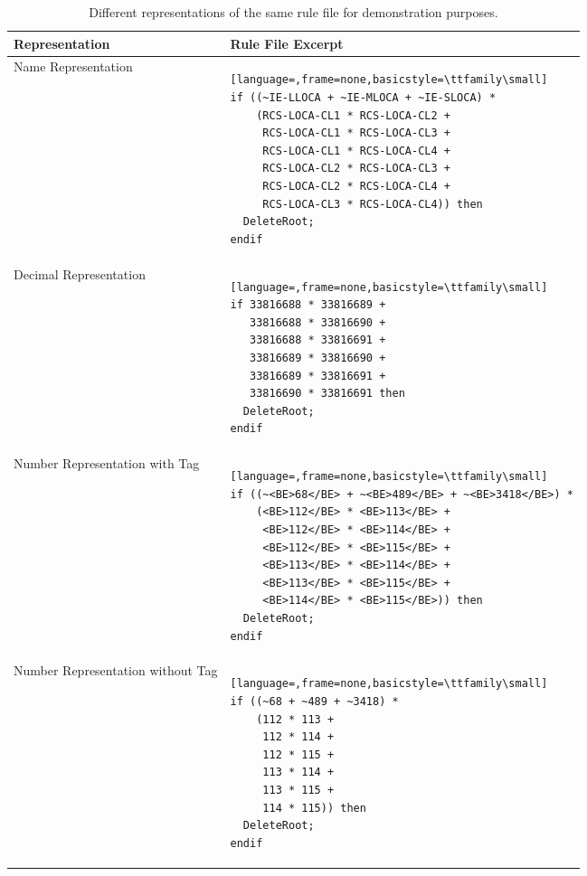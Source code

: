\begin{table}[H]
\centering
\caption{Different representations of the same rule file for demonstration purposes.}
\label{tab:rule-file-representations}
\begin{tabular}{@{}ll@{}}
\toprule
\textbf{Representation} & \textbf{Rule File Excerpt} \\
\midrule
Name Representation &
\begin{lstlisting}[language=,frame=none,basicstyle=\ttfamily\small]
if ((~IE-LLOCA + ~IE-MLOCA + ~IE-SLOCA) *
    (RCS-LOCA-CL1 * RCS-LOCA-CL2 +
     RCS-LOCA-CL1 * RCS-LOCA-CL3 +
     RCS-LOCA-CL1 * RCS-LOCA-CL4 +
     RCS-LOCA-CL2 * RCS-LOCA-CL3 +
     RCS-LOCA-CL2 * RCS-LOCA-CL4 +
     RCS-LOCA-CL3 * RCS-LOCA-CL4)) then
  DeleteRoot;
endif
\end{lstlisting}
\\
\midrule
Decimal Representation &
\begin{lstlisting}[language=,frame=none,basicstyle=\ttfamily\small]
if 33816688 * 33816689 +
   33816688 * 33816690 +
   33816688 * 33816691 +
   33816689 * 33816690 +
   33816689 * 33816691 +
   33816690 * 33816691 then
  DeleteRoot;
endif
\end{lstlisting}
\\
\midrule
Number Representation with Tag &
\begin{lstlisting}[language=,frame=none,basicstyle=\ttfamily\small]
if ((~<BE>68</BE> + ~<BE>489</BE> + ~<BE>3418</BE>) *
    (<BE>112</BE> * <BE>113</BE> +
     <BE>112</BE> * <BE>114</BE> +
     <BE>112</BE> * <BE>115</BE> +
     <BE>113</BE> * <BE>114</BE> +
     <BE>113</BE> * <BE>115</BE> +
     <BE>114</BE> * <BE>115</BE>)) then
  DeleteRoot;
endif
\end{lstlisting}
\\
\midrule
Number Representation without Tag &
\begin{lstlisting}[language=,frame=none,basicstyle=\ttfamily\small]
if ((~68 + ~489 + ~3418) *
    (112 * 113 +
     112 * 114 +
     112 * 115 +
     113 * 114 +
     113 * 115 +
     114 * 115)) then
  DeleteRoot;
endif
\end{lstlisting}
\\
\bottomrule
\end{tabular}
\end{table}